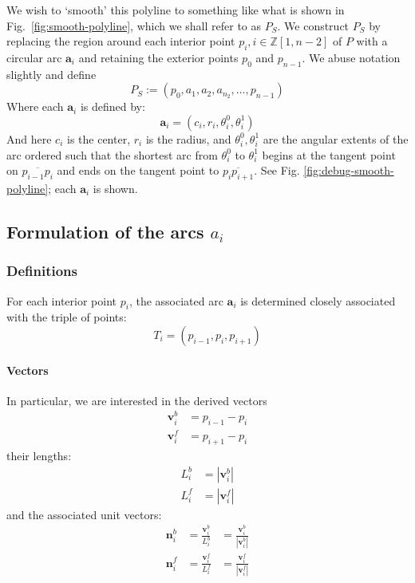 \documentclass{article}
\begin{document}
%
We wish to `smooth' this polyline to something like what is shown in Fig.~\ref{fig:smooth-polyline}, which we shall refer to as $P_S$.  We construct $P_S$ by replacing the region around each interior point $p_{i}, i \in \mathbb{Z}\left[1, n-2\right]$ of $P$ with a circular arc $\mathbf{a}_{i}$ and retaining the exterior points $p_0$ and $p_{n-1}$.  We abuse notation slightly and define
%
\begin{equation}
  \label{eq:p-smooth}
  P_S := \left(p_0, a_1, a_2, a_{n_2}, \ldots, p_{n-1}\right)
\end{equation}
%
Where each $\mathbf{a}_{i}$ is defined by:
%
\begin{equation}
  \label{eq:circ-def}
\mathbf{a}_i=\left(
  c_{i},
  r_{i},
  \theta^{0}_{i},
  \theta^{1}_{i}
\right)
\end{equation}
%
And here $c_{i}$ is the center, $r_{i}$ is the radius, and $\theta^{0}_{i}, \theta^{1}_{i}$ are the angular extents of the arc ordered such that the shortest arc from $\theta^0_i$ to $\theta^1_i$ begins at the tangent point on $\overline{p_{i-1}p_i}$ and ends on the tangent point to $\overline{p_ip_{i+1}}$.  See Fig. \ref{fig:debug-smooth-polyline}; each $\mathbf{a}_{i}$ is shown.
%
\subsection{Formulation of the arcs $a_{i}$}
\label{sec:formulation-arcs}
%
\subsubsection{Definitions}
%
For each interior point $p_{i}$, the associated arc $\mathbf{a}_{i}$ is determined closely associated with the triple of points:
%
\begin{equation}
  \label{eq:arc-triple}
  T_{i} = \left(p_{i-1}, p_{i}, p_{i+1}\right)
\end{equation}
%
\paragraph{Vectors}
%
In particular, we are interested in the derived vectors
%
\begin{align}
  \label{eq:vector-b}
  \mathbf{v}^{b}_{i} &= p_{i-1} - p_{i}\\
  \label{eq:vector-f}
  \mathbf{v}^{f}_{i} &= p_{i+1} - p_{i}
\end{align}
%
their lengths:
%
\begin{align}
  \label{eq:vector-length-b}
  L^{b}_{i} &= \left|\mathbf{v}^{b}_{i}\right|\\
  \label{eq:vector-length-f}
  L^{f}_{i} &= \left|\mathbf{v}^{f}_{i}\right|
\end{align}
%
and the associated unit vectors:
%
\begin{align}
  \label{eq:unit-vector-b}
  \mathbf{n}^{b}_{i} &= \frac{\mathbf{v}^{b}_{i}}{L^{b}_{i}} &=\frac{\mathbf{v}^{b}_{i}}{\left|\mathbf{v}^{b}_{i}\right|}\\
  \label{eq:unit-vectors-f}
  \mathbf{n}^{f}_{i} &= \frac{\mathbf{v}^{f}_{i}}{L^{f}_{i}} &=\frac{\mathbf{v}^{f}_{i}}{\left|\mathbf{v}^{f}_{i}\right|}
\end{align}
%
\end{document}

